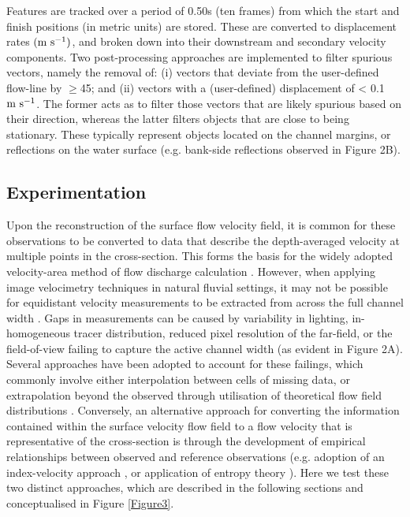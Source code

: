 \documentclass[hess, manuscript]{copernicus} %
\begin{document}
Features are tracked over a period of 0.50s (ten frames) from which the start and finish positions (in metric units) are stored. These are converted to displacement rates $(\textnormal{m s\textsuperscript{-1}})$, and broken down into their downstream and secondary velocity components. Two post-processing approaches are implemented to filter spurious vectors, namely the removal of: (i) vectors that deviate from the user-defined flow-line by $\geq$45\degree; and (ii) vectors with a (user-defined) displacement of < 0.1$\textnormal{m s\textsuperscript{-1}}$. The former acts as to filter those vectors that are likely spurious based on their direction, whereas the latter filters objects that are close to being stationary. These typically represent objects located on the channel margins, or reflections on the water surface (e.g. bank-side reflections observed in Figure 2B).


\subsection{Experimentation} 
\label{experimentation}
Upon the reconstruction of the surface flow velocity field, it is common for these observations to be converted to data that describe the depth-averaged velocity at multiple points in the cross-section. This forms the basis for the widely adopted velocity-area method of flow discharge calculation \citep{Herschy2014}. However, when applying image velocimetry techniques in natural fluvial settings, it may not be possible for equidistant velocity measurements to be extracted from across the full channel width \citep[e.g.][]{Haro2021,Hutley2023}. Gaps in measurements can be caused by variability in lighting, in-homogeneous tracer distribution, reduced pixel resolution of the far-field, or the field-of-view failing to capture the active channel width (as evident in Figure 2A). Several approaches have been adopted to account for these failings, which commonly involve either interpolation between cells of missing data, or extrapolation beyond the observed through utilisation of theoretical flow field distributions \citep{Leitao2018,LeCoz2010, Fulford1986}. Conversely, an alternative approach for converting the information contained within the surface velocity flow field to a flow velocity that is representative of the cross-section is through the development of empirical relationships between observed and reference observations (e.g. adoption of an index-velocity approach \citep{Levesque2012}, or application of entropy theory \citep{Chiu1989, Moramarco2010, Bahmanpouri2022, vyas2024}). Here we test these two distinct approaches, which are described in the following sections and conceptualised in Figure \ref{Figure3}.
\end{document}

